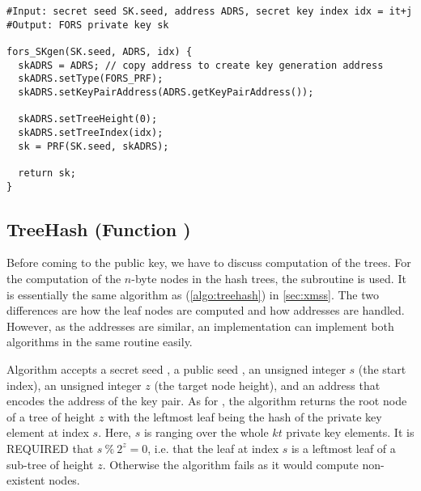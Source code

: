 \begin{lstlisting}[label=alg:fors_skgen, language=pseudoc,
                   caption=\texttt{fors\_SKgen} -- Computing a \fors private key value.]
#Input: secret seed SK.seed, address ADRS, secret key index idx = it+j
#Output: FORS private key sk

fors_SKgen(SK.seed, ADRS, idx) {
  skADRS = ADRS; // copy address to create key generation address
  skADRS.setType(FORS_PRF);
  skADRS.setKeyPairAddress(ADRS.getKeyPairAddress());

  skADRS.setTreeHeight(0);
  skADRS.setTreeIndex(idx);
  sk = PRF(SK.seed, skADRS);

  return sk;
}
\end{lstlisting}

\subsection{\fors TreeHash (Function \forstreehash)}
   Before coming to the \fors public key, we have to discuss computation of the
   trees.
   For the computation of the $n$-byte nodes in the \fors hash trees,
   the subroutine \forstreehash is used. It is essentially the same algorithm
   as \treehash (\autoref{algo:treehash}) in \autoref{sec:xmss}. The two
   differences are how the leaf nodes are computed and how addresses are handled.
   However, as the addresses are similar, an implementation can implement both
   algorithms in the same routine easily.

   Algorithm \forstreehash accepts a secret seed \sseed,
   a public seed \pseed, an unsigned integer $s$ (the start index), an
   unsigned integer $z$ (the target node height), and an address \adrs that
   encodes the address of the \fors key pair. As for \treehash, the
   \forstreehash algorithm returns the root node of a tree of height $z$ with
   the leftmost leaf being the hash of the private key element at index $s$.
   Here, $s$ is ranging over the whole $kt$ private key elements.
   It is REQUIRED that $s\ \%\ 2^z = 0$, i.e. that the leaf at index $s$ is a
   leftmost leaf of a sub-tree of height $z$.  Otherwise the algorithm fails
   as it would compute non-existent nodes.

